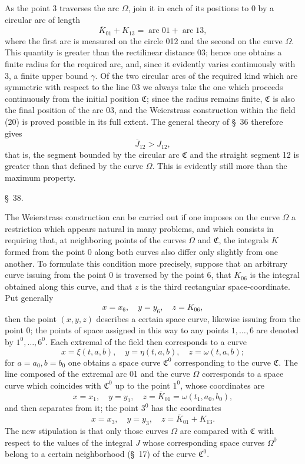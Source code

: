 \documentclass[11pt,a4paper,leqno]{article}
\begin{document}
As the point 3 traverses the arc $\Omega$, join it in each of its positions to 0 by a circular arc of length
\[
\overline{K}_{01}+K_{13}=\operatorname{arc}01+\operatorname{arc}13,
\]
where the first arc is measured on the circle 012 and the second on the curve $\Omega$. This quantity is greater than the rectilinear distance 03; hence one obtains a finite radius for the required arc, and, since it evidently varies continuously with 3, a finite upper bound $\gamma$. Of the two circular arcs of the required kind which are symmetric with respect to the line 03 we always take the one which proceeds continuously from the initial position $\mathfrak{C}$; since the radius remains finite, $\mathfrak{C}$ is also the final position of the arc 03, and the Weierstrass construction within the field (20) is proved possible in its full extent. The general theory of \S~36 therefore gives
\[
\overline{J}_{12}>J_{12},
\]
that is, the segment bounded by the circular arc $\mathfrak{C}$ and the straight segment 12 is
greater than that defined by the curve $\Omega$. This is evidently still more than the maximum property.

\begin{center}
{\large \S~38.}
\end{center}

The Weierstrass construction can be carried out if one imposes on the curve $\Omega$ a restriction which appears natural in many problems, and which consists in requiring that, at neighboring points of the curves $\Omega$ and $\mathfrak{C}$, the integrals $K$ formed from the point 0 along both curves also differ only slightly from one another. To formulate this condition more precisely, suppose that an arbitrary curve issuing from the point 0 is traversed by the point 6, that $K_{06}$ is the integral obtained along this curve, and that $z$ is the third rectangular space-coordinate. Put generally
\[
x=x_6,\quad y=y_6,\quad z=K_{06},
\]
then the point $(x,y,z)$ describes a certain space curve, likewise issuing from the point 0; the points of space assigned in this way to any points $1,\ldots,6$ are denoted by $1^0,\ldots,6^0$. Each extremal of the field then corresponds to a curve
\[
x=\xi(t,a,b),\quad y=\eta(t,a,b),\quad z=\omega(t,a,b);
\]
for $a=a_0,b=b_0$ one obtains a space curve $\mathfrak{C}^0$ corresponding to the curve $\mathfrak{C}$. The line composed of the extremal arc 01 and the curve $\Omega$ corresponds to a space curve which coincides with $\mathfrak{C}^0$ up to the point $1^0$, whose coordinates are
\[
x=x_1,\quad y=y_1,\quad z=\overline{K}_{01}=\omega(t_1,a_0,b_0),
\]
and then separates from it; the point $3^0$ has the coordinates
\begin{equation}\tag{21}
x=x_3,\quad y=y_3,\quad z=\overline{K}_{01}+K_{13}.
\end{equation}
The new stipulation is that only those curves $\Omega$ are compared with $\mathfrak{C}$ with respect to the values of the integral $J$ whose corresponding space curves $\Omega^0$ belong to a certain neighborhood (\S~17) of the curve $\mathfrak{C}^0$.
\end{document}
